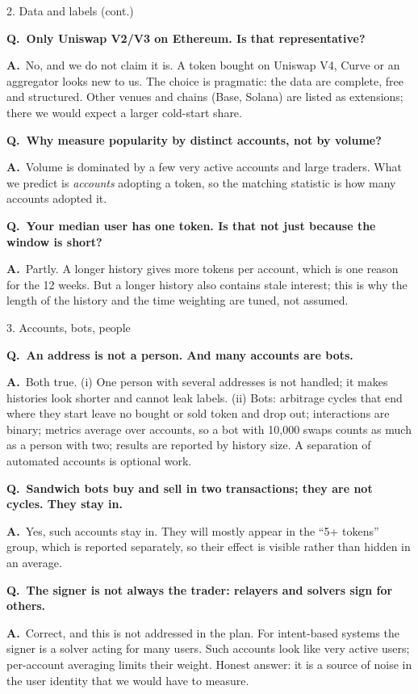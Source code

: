 \documentclass[aspectratio=169,10pt]{beamer}
\newcommand{\Q}[1]{\par{\color{orange}\bfseries Q.\ #1}\par\smallskip}
\newcommand{\A}{{\color{teal}\bfseries A.}\ }
\newcommand{\toindex}{\hfill\hyperlink{index}{\beamerreturnbutton{index}}}
\newcommand{\qsep}{\par\medskip{\color{grey!40}\hrule}\medskip}
\begin{document}
\begin{frame}{2. Data and labels (cont.) \toindex}
  \footnotesize
  \Q{Only Uniswap V2/V3 on Ethereum. Is that representative?}
  \A No, and we do not claim it is. A token bought on Uniswap V4, Curve or an aggregator looks new to us. The choice is pragmatic: the data are complete, free and structured. Other venues and chains (Base, Solana) are listed as extensions; there we would expect a larger cold-start share.
  \qsep
  \Q{Why measure popularity by distinct accounts, not by volume?}
  \A Volume is dominated by a few very active accounts and large traders. What we predict is \emph{accounts} adopting a token, so the matching statistic is how many accounts adopted it.
  \qsep
  \Q{Your median user has one token. Is that not just because the window is short?}
  \A Partly. A longer history gives more tokens per account, which is one reason for the 12 weeks. But a longer history also contains stale interest; this is why the length of the history and the time weighting are tuned, not assumed.
\end{frame}

\begin{frame}[label=qbots]{3. Accounts, bots, people \toindex}
  \footnotesize
  \Q{An address is not a person. And many accounts are bots.}
  \A Both true. (i) One person with several addresses is not handled; it makes histories look shorter and cannot leak labels. (ii) Bots: arbitrage cycles that end where they start leave no bought or sold token and drop out; interactions are binary; metrics average over accounts, so a bot with 10{,}000 swaps counts as much as a person with two; results are reported by history size. A separation of automated accounts is optional work.
  \qsep
  \Q{Sandwich bots buy and sell in two transactions; they are not cycles. They stay in.}
  \A Yes, such accounts stay in. They will mostly appear in the ``5+ tokens'' group, which is reported separately, so their effect is visible rather than hidden in an average.
  \qsep
  \Q{The signer is not always the trader: relayers and solvers sign for others.}
  \A Correct, and this is not addressed in the plan. For intent-based systems the signer is a solver acting for many users. Such accounts look like very active users; per-account averaging limits their weight. Honest answer: it is a source of noise in the user identity that we would have to measure.
\end{frame}
\end{document}

